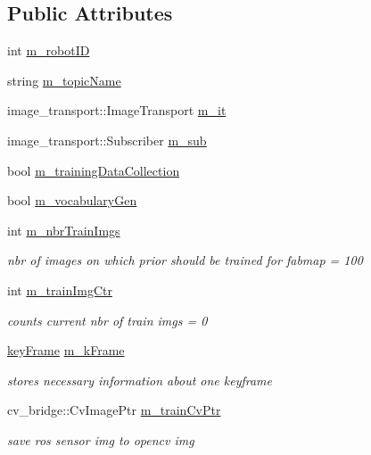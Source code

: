 \subsection*{\-Public \-Attributes}
\begin{DoxyCompactItemize}
\item 
int \hyperlink{classKeyFrameListenerTraining_ac4bc91c462f7cbf1364087c8c7177ee5}{m\-\_\-robot\-I\-D}
\item 
string \hyperlink{classKeyFrameListenerTraining_aa6e0e60a43e678d54a90201c9ec34deb}{m\-\_\-topic\-Name}
\item 
image\-\_\-transport\-::\-Image\-Transport \hyperlink{classKeyFrameListenerTraining_a5063e03ecd884134bbffc0e32dfa71e2}{m\-\_\-it}
\item 
image\-\_\-transport\-::\-Subscriber \hyperlink{classKeyFrameListenerTraining_a3b368cdbbe4bbb92bf47a35d01d55644}{m\-\_\-sub}
\item 
bool \hyperlink{classKeyFrameListenerTraining_a32ea513679de826627bc20c3598bab1b}{m\-\_\-training\-Data\-Collection}
\item 
bool \hyperlink{classKeyFrameListenerTraining_ab9a3dd6c3e61b1ac6271d891bddbd037}{m\-\_\-vocabulary\-Gen}
\item 
int \hyperlink{classKeyFrameListenerTraining_aff6e3d535158a78b464c731d22af308e}{m\-\_\-nbr\-Train\-Imgs}
\begin{DoxyCompactList}\small\item\em nbr of images on which prior should be trained for fabmap = 100 \end{DoxyCompactList}\item 
int \hyperlink{classKeyFrameListenerTraining_a527a1a7e1b02deacba5b417fa61fc367}{m\-\_\-train\-Img\-Ctr}
\begin{DoxyCompactList}\small\item\em counts current nbr of train imgs = 0 \end{DoxyCompactList}\item 
\hyperlink{structkeyFrame}{key\-Frame} \hyperlink{classKeyFrameListenerTraining_af9f9545cdabdc24d58237de03234c10f}{m\-\_\-k\-Frame}
\begin{DoxyCompactList}\small\item\em stores necessary information about one keyframe \end{DoxyCompactList}\item 
cv\-\_\-bridge\-::\-Cv\-Image\-Ptr \hyperlink{classKeyFrameListenerTraining_a6ae5ff8937a42f0d70404b7b8cd572c2}{m\-\_\-train\-Cv\-Ptr}
\begin{DoxyCompactList}\small\item\em save ros sensor img to opencv img \end{DoxyCompactList}\item 

\end{DoxyCompactItemize}
